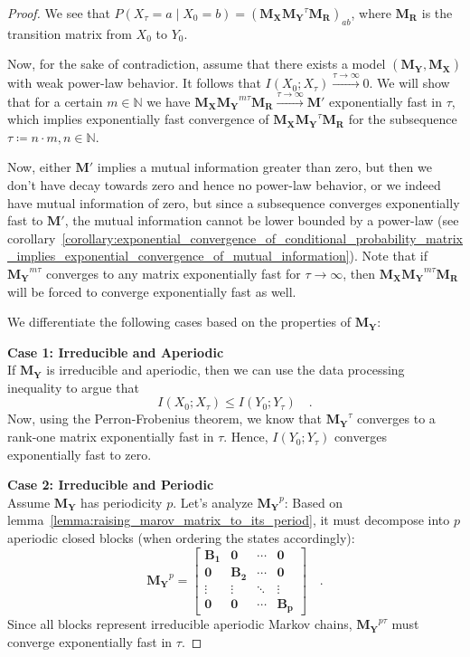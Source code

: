 \documentclass[../../main.tex]{subfiles}
\begin{document}
\begin{proof}
        We see that $P(X_{\tau} = a \mid X_0 = b) = (\bm{M_X} \bm{M_Y}^\tau \bm{M_R})_{ab}$, where $\bm{M_R}$ is the transition matrix from $X_0$ to $Y_0$.

        Now, for the sake of contradiction, assume that there exists a model $(\bm{M_Y}, \bm{M_X})$ with weak power-law behavior. It follows that $I(X_0; X_{\tau}) \xrightarrow{\tau \to \infty} 0$. We will show that for a certain $m \in \mathbb{N}$ we have $\bm{M_X} \bm{M_Y}^{m \tau} \bm{M_R} \xrightarrow{\tau \to \infty} \bm{M'}$ exponentially fast in $\tau$, which implies exponentially fast convergence of $\bm{M_X} \bm{M_Y}^{\tau} \bm{M_R}$ for the subsequence $\tau \coloneqq n \cdot m, n \in \mathbb{N}$.
        
        Now, either $\bm{M'}$ implies a mutual information greater than zero, but then we don't have decay towards zero and hence no power-law behavior, or we indeed have mutual information of zero, but since a subsequence converges exponentially fast to $\bm{M'}$, the mutual information cannot be lower bounded by a power-law (see corollary~\ref{corollary:exponential_convergence_of_conditional_probability_matrix_implies_exponential_convergence_of_mutual_information}). Note that if $\bm{M_Y}^{m \tau}$ converges to any matrix exponentially fast for $\tau \to \infty$, then $\bm{M_X} \bm{M_Y}^{m \tau} \bm{M_R}$ will be forced to converge exponentially fast as well.
        
        We differentiate the following cases based on the properties of $\bm{M_Y}$:

        \textbf{Case 1: Irreducible and Aperiodic} \\
        If $\bm{M_Y}$ is irreducible and aperiodic, then we can use the data processing inequality to argue that
        \[
            I(X_0; X_\tau) \leq I(Y_0; Y_\tau) \quad .
        \]
        Now, using the Perron-Frobenius theorem, we know that $\bm{M_Y}^\tau$ converges to a rank-one matrix exponentially fast in $\tau$. Hence, $I(Y_0; Y_\tau)$ converges exponentially fast to zero.

        \textbf{Case 2: Irreducible and Periodic} \\
        Assume $\bm{M_Y}$ has periodicity $p$. Let's analyze $\bm{M_Y}^p$: Based on lemma~\ref{lemma:raising_marov_matrix_to_its_period}, it must decompose into $p$ aperiodic closed blocks (when ordering the states accordingly):
        \[
            \bm{M_Y}^p = 
            \begin{bmatrix}
            \bm{B_1} & \bm{0} & \cdots & \bm{0} \\
            \bm{0} & \bm{B_2} & \cdots & \bm{0} \\
            \vdots & \vdots & \ddots & \vdots \\
            \bm{0} & \bm{0} & \cdots & \bm{B_p}
            \end{bmatrix}
            \quad .
        \]
        Since all blocks represent irreducible aperiodic Markov chains, $\bm{M_Y}^{p \tau}$ must converge exponentially fast in $\tau$.


\end{proof}
\end{document}
